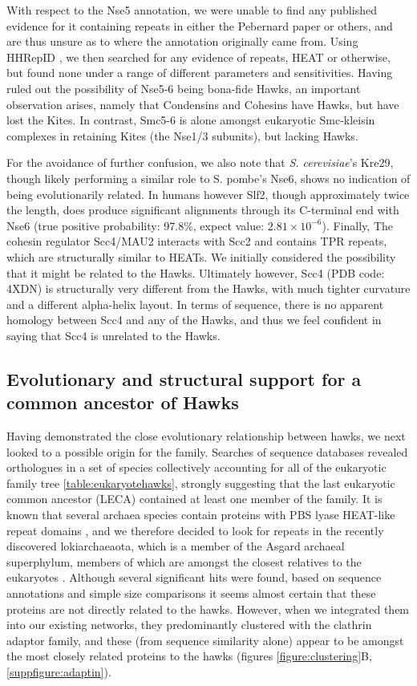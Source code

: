 \documentclass[a4paper,11pt,twoside,openright]{scrbook}
\begin{document}
With respect to the Nse5 annotation, we were unable to find any published evidence for it containing repeats in either the Pebernard paper or others, and are thus unsure as to where the annotation originally came from. Using HHRepID \cite{Biegert2008}, we then searched for any evidence of repeats, HEAT or otherwise, but found none under a range of different parameters and sensitivities. Having ruled out the possibility of Nse5-6 being bona-fide Hawks, an important observation arises, namely that Condensins and Cohesins have Hawks, but have lost the Kites. In contrast, Smc5-6 is alone amongst eukaryotic Smc-kleisin complexes in retaining Kites (the Nse1/3 subunits), but lacking Hawks.

For the avoidance of further confusion, we also note that \textit{S. cerevisiae}'s Kre29, though likely performing a similar role to S. pombe’s Nse6, shows no indication of being evolutionarily related. In humans however Slf2, though approximately twice the length, does produce significant alignments through its C-terminal end with Nse6 (true positive probability: 97.8\%, expect value: $2.81\times10^{-6}$). Finally, The cohesin regulator Scc4/MAU2 interacts with Scc2 and contains TPR repeats, which are structurally similar to HEATs. We initially considered the possibility that it might be related to the Hawks. Ultimately however, Scc4 (PDB code: 4XDN) is structurally very different from the Hawks, with much tighter curvature and a different alpha-helix layout. In terms of sequence, there is no apparent homology between Scc4 and any of the Hawks, and thus we feel confident in saying that Scc4 is unrelated to the Hawks.

\subsection{Evolutionary and structural support for a common ancestor of Hawks}

Having demonstrated the close evolutionary relationship between hawks, we next looked to a possible origin for the family. Searches of sequence databases revealed orthologues in a set of species collectively accounting for all of the eukaryotic family tree \ref{table:eukaryotehawks}, strongly suggesting that the last eukaryotic common ancestor (LECA) contained at least one member of the family. It is known that several archaea species contain proteins with PBS lyase HEAT-like repeat domains \cite{Schlesner2009}, and we therefore decided to look for repeats in the recently discovered lokiarchaeaota, which is a member of the Asgard archaeal superphylum, members of which are amongst the closest relatives to the eukaryotes \cite{Spang2015,Zaremba-Niedzwiedzka2017}. Although several significant hits were found, based on sequence annotations and simple size comparisons it seems almost certain that these proteins are not directly related to the hawks. However, when we integrated them into our existing networks, they predominantly clustered with the clathrin adaptor family, and these (from sequence similarity alone) appear to be amongst the most closely related proteins to the hawks (figures \ref{figure:clustering}B, \ref{suppfigure:adaptin}).
\end{document}
